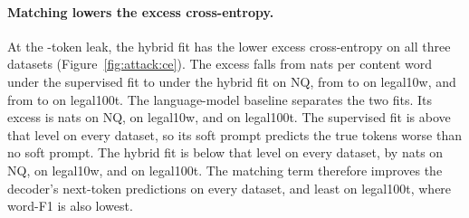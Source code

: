 \paragraph{Matching lowers the excess cross-entropy.} At the -token leak, the hybrid fit has the lower excess cross-entropy on all three datasets (Figure~\ref{fig:attack:ce}).
The excess falls from  nats per content word under the supervised fit to  under the hybrid fit on NQ, from  to  on legal10w, and from  to  on legal100t.
The language-model baseline separates the two fits.
Its excess is  nats on NQ,  on legal10w, and  on legal100t.
The supervised fit is above that level on every dataset, so its soft prompt predicts the true tokens worse than no soft prompt.
The hybrid fit is below that level on every dataset, by  nats on NQ,  on legal10w, and  on legal100t.
The matching term therefore improves the decoder's next-token predictions on every dataset, and least on legal100t, where word-F1 is also lowest.


